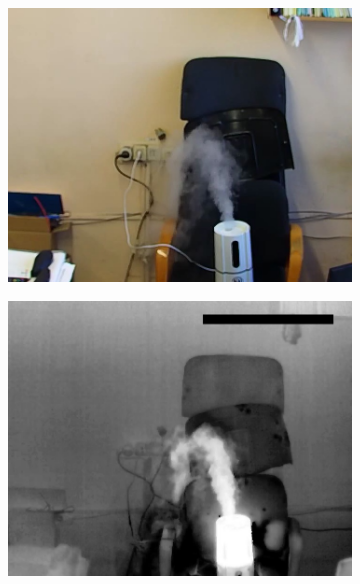 \documentclass[14pt, a4paper]{extreport}
\begin{document}
	\begin{figure}[h!]
		\vspace*{0.22cm}
		\begin{subfigure}{.32\textwidth}
			\centering
			\includegraphics[width = \textwidth]{image/chapter_3/examples/img/151}
		\end{subfigure}
		\begin{subfigure}{.32\textwidth}
			\centering
			\includegraphics[width = \textwidth]{image/chapter_3/examples/tep/151}
		\end{subfigure}
		\begin{subfigure}{.32\textwidth}

\end{subfigure}
\end{figure}
\end{document}
